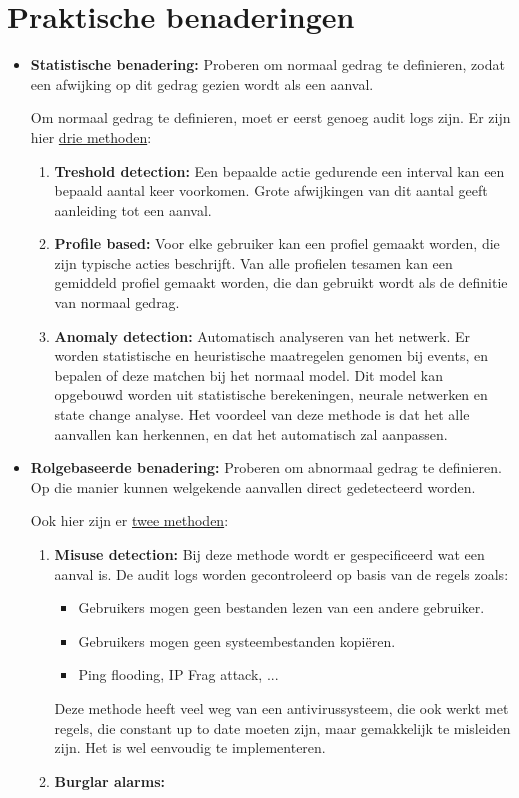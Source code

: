 \documentclass{report}
\begin{document}
	\section{Praktische benaderingen}
	\begin{itemize}
		\item[\info] \textbf{Statistische benadering:} Proberen om normaal gedrag te definieren, zodat een afwijking op dit gedrag gezien wordt als een aanval.

		Om normaal gedrag te definieren, moet er eerst genoeg audit logs zijn. Er zijn hier \underline{drie methoden}:
		\begin{enumerate}
			\item \textbf{Treshold detection:} Een bepaalde actie gedurende een interval kan een bepaald aantal keer voorkomen. Grote afwijkingen van dit aantal geeft aanleiding tot een aanval. 
			\item \textbf{Profile based:} Voor elke gebruiker kan een profiel gemaakt worden, die zijn typische acties beschrijft. Van alle profielen tesamen kan een gemiddeld profiel gemaakt worden, die dan gebruikt wordt als de definitie van normaal gedrag.
			\item \textbf{Anomaly detection:} Automatisch analyseren van het netwerk. Er worden statistische en heuristische maatregelen genomen bij events, en bepalen of deze matchen bij het normaal model. Dit model kan opgebouwd worden uit statistische berekeningen, neurale netwerken en state change analyse. Het voordeel van deze methode is dat het alle aanvallen kan herkennen, en dat het automatisch zal aanpassen.
		\end{enumerate}
		\item[\info] \textbf{Rolgebaseerde benadering:} Proberen om abnormaal gedrag te definieren. Op die manier kunnen welgekende aanvallen direct gedetecteerd worden.

		Ook hier zijn er \underline{twee methoden}:
		\begin{enumerate}
			\item \textbf{Misuse detection:} Bij deze methode wordt er gespecificeerd wat een aanval is. De audit logs worden gecontroleerd op basis van de regels zoals: 
			\begin{itemize}
				\item Gebruikers mogen geen bestanden lezen van een andere gebruiker.
				\item Gebruikers mogen geen systeembestanden kopiëren.
				\item Ping flooding, IP Frag attack, ...
			\end{itemize}

			Deze methode heeft veel weg van een antivirussysteem, die ook werkt met regels, die constant up to date moeten zijn, maar gemakkelijk te misleiden zijn. Het is wel eenvoudig te implementeren.
			\item \textbf{Burglar alarms:} 
		\end{enumerate}

	\end{itemize}
\end{document}
